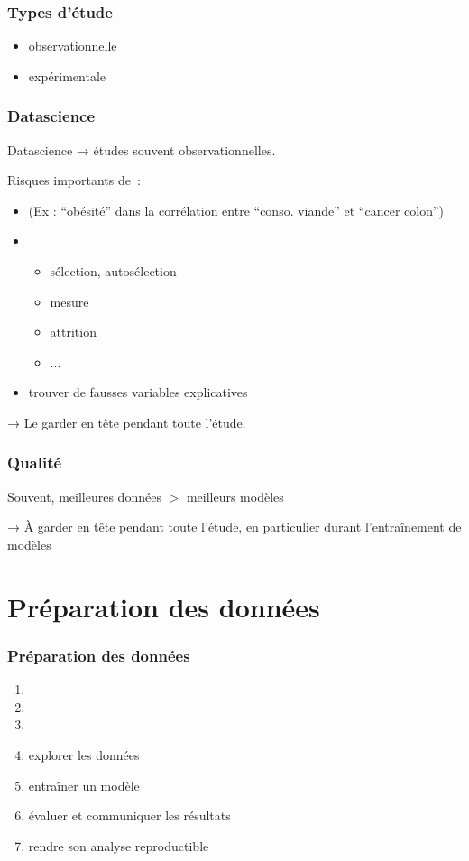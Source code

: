 \documentclass{formation}
\begin{document}
\begin{frame}
  \frametitle{Types d'étude}
  \begin{itemize}
  \item observationnelle
  \item expérimentale
  \end{itemize}

\end{frame}

\begin{frame}
  \frametitle{Datascience}

  Datascience → études souvent observationnelles.

  Risques importants de :

  \begin{itemize}[<+->]
  \item {} (Ex : ``obésité'' dans la corrélation entre ``conso. viande'' et ``cancer colon'')
  \item {}
    \begin{itemize}[<+->]
    \item sélection, autosélection
    \item mesure
    \item attrition
    \item ...
    \end{itemize}
  \item trouver de fausses variables explicatives
  \end{itemize}

  \pause

  → Le garder en tête pendant toute l'étude.
\end{frame}

\begin{frame}
  \frametitle{Qualité}

  Souvent, meilleures données $>$ meilleurs modèles

  → À garder en tête pendant toute l'étude, en particulier durant
  l'entraînement de modèles
\end{frame}

\section{Préparation des données}

\begin{frame}
  \frametitle{Préparation des données}
  \begin{enumerate}
  \item {}
  \item {}
  \item {}
  \item explorer les données
  \item entraîner un modèle
  \item évaluer et communiquer les résultats
  \item rendre son analyse reproductible
  \end{enumerate}
\end{frame}
\end{document}
